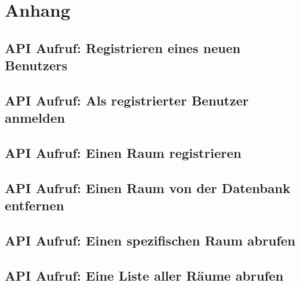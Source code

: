 \section{Anhang}


%


\subsection{API Aufruf: Registrieren eines neuen Benutzers}
\label{app:API_register}

\subsection{API Aufruf: Als registrierter Benutzer anmelden}
\label{app:API_login}

\subsection{API Aufruf: Einen Raum registrieren}
\label{app:API_register_room}

\subsection{API Aufruf: Einen Raum von der Datenbank entfernen}
\label{app:API_delete_room}

\subsection{API Aufruf: Einen spezifischen Raum abrufen}
\label{app:API_show_room}

\subsection{API Aufruf: Eine Liste aller Räume abrufen}
\label{app:API_show_rooms}

